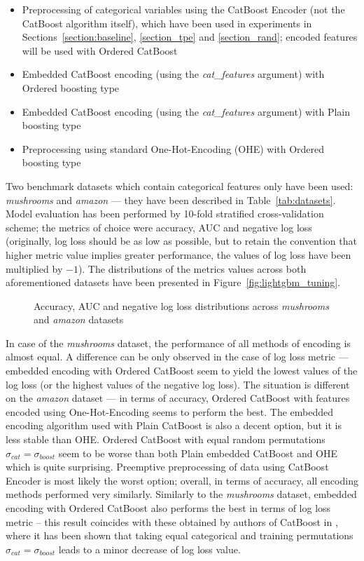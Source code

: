 \documentclass[magisterska, english]{pwr_wmat_praca_dyplomowa}
\theoremstyle{plain}
\numberwithin{theorem}{chapter}
\theoremstyle{definition}
\numberwithin{theorem}{chapter}
\begin{document}
\begin{itemize}
    \item Preprocessing of categorical variables using the CatBoost Encoder (not the CatBoost algorithm itself), which have been used in experiments in Sections~\ref{section:baseline}, \ref{section_tpe} and \ref{section_rand}; encoded features will be used with Ordered CatBoost
    \item Embedded CatBoost encoding (using the \emph{cat\_features} argument) with Ordered boosting type
    \item Embedded CatBoost encoding (using the \emph{cat\_features} argument) with Plain boosting type
    \item Preprocessing using standard One-Hot-Encoding (OHE) with Ordered boosting type
\end{itemize}

Two benchmark datasets which contain categorical features only have been used: \emph{mushrooms} and \emph{amazon} --- they have been described in Table~\ref{tab:datasets}. Model evaluation has been performed by 10-fold stratified cross-validation scheme; the metrics of choice were accuracy, AUC and negative log loss (originally, log loss should be as low as possible, but to retain the convention that higher metric value implies greater performance, the values of log loss have been multiplied by $-1$). The distributions of the metrics values across both aforementioned datasets have been presented in Figure~\ref{fig:lightgbm_tuning}.

\begin{figure}[H]
	\centering
	\caption{Accuracy, AUC and negative log loss distributions across \emph{mushrooms} and \emph{amazon} datasets}
	\label{fig:catboost_categorical_results}
\end{figure}

In case of the \emph{mushrooms} dataset, the performance of all methods of encoding is almost equal. A difference can be only observed in the case of log loss metric --- embedded encoding with Ordered CatBoost seem to yield the lowest values of the log loss (or the highest values of the negative log loss). The situation is different on the \emph{amazon} dataset --- in terms of accuracy, Ordered CatBoost with features encoded using One-Hot-Encoding seems to perform the best. The embedded encoding algorithm used with Plain CatBoost  is also a decent option, but it is less stable than OHE. Ordered CatBoost with equal random permutations $\sigma_{cat} = \sigma_{boost}$ seem to be worse than both Plain embedded CatBoost and OHE which is quite surprising. Preemptive preprocessing of data using CatBoost Encoder is most likely the worst option; overall, in terms of accuracy, all encoding methods performed very similarly. Similarly to the \emph{mushrooms} dataset, embedded encoding with Ordered CatBoost also performs the best in terms of log loss metric -- this result coincides with these obtained by authors of CatBoost in \cite{catboost}, where it has been shown that taking equal categorical and training permutations $\sigma_{cat} = \sigma_{boost}$ leads to a minor decrease of log loss value.
\end{document}
